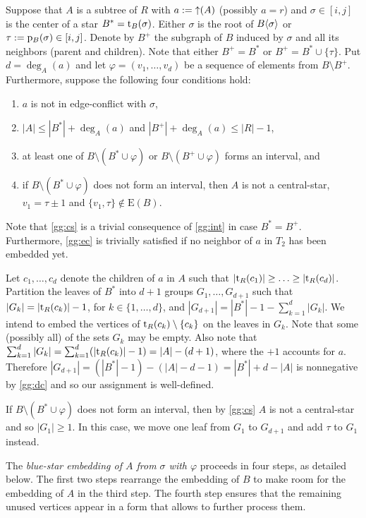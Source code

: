 \documentclass[11pt,a4paper,colorlinks=true,urlcolor=blue,citecolor=red]{article}
\theoremstyle{plain}
\newcommand{\EB}{\mathrm{E}(B)}
\begin{document}
Suppose that $A$ is a subtree of $R$ with $a:=\mathop{\uparrow}(A)$ (possibly
$a=r$) and $\sigma\in[i,j]$ is the center of a star $B^*=\mathrm t_B(\sigma)$.
Either $\sigma$ is the root of $B\langle{\sigma}\rangle$ or
$\tau:=\mathrm p_B(\sigma)\in[i,j]$. Denote by $B^+$ the subgraph of $B$
induced by $\sigma$ and all its neighbors (parent and children). Note
that either $B^+=B^*$ or $B^+=B^*\cup\{\tau\}$. Put $d=\deg_A(a)$ and
let $\varphi=(v_1,\ldots,v_d)$ be a sequence of elements from
$B\setminus B^+$. Furthermore, suppose the following four conditions
hold:
\begin{enumerate}[label={(BS\arabic*)}]\setlength{\itemindent}{4\labelsep}
  \item\label{gg:ec} $a$ is not in edge-conflict with $\sigma$,
  \item\label{gg:dc} $|A|\le|B^*|+\deg_A(a)$ and
    $|B^+|+\deg_A(a)\le|R|-1$,
  \item\label{gg:int} at least one of $B\setminus(B^*\cup\varphi)$ or
    $B\setminus(B^+\cup\varphi)$ forms an interval, and
  \item\label{gg:cs} if $B\setminus(B^*\cup\varphi)$ does not form an
    interval, then $A$ is not a central-star, $v_1=\tau\pm 1$ and
    $\{v_1,\tau\}\notin\EB$.
  \end{enumerate}
Note that \ref{gg:cs} is a trivial consequence of \ref{gg:int} in case
$B^*=B^+$. Furthermore, \ref{gg:ec} is trivially satisfied if no
neighbor of $a$ in $T_2$ has been embedded yet.

Let $c_1,\ldots,c_d$ denote the children of $a$ in $A$ such that
$|\mathrm t_R(c_1)|\ge\ldots\ge|\mathrm t_R(c_d)|$. Partition the leaves of $B^*$
into $d+1$ groups $G_1,\ldots,G_{d+1}$ such that $|G_k|=|\mathrm t_R(c_k)|-1$,
for $k\in\{1,\ldots,d\}$, and $|G_{d+1}|=|B^*|-1-\sum_{k=1}^d|G_k|$. We
intend to embed the vertices of $\mathrm t_R(c_k)\setminus\{c_k\}$ on the
leaves in $G_k$. Note that some (possibly all) of the sets $G_k$ may be
empty. Also note that
$\sum_{k=1}^d|G_k|=\sum_{k=1}^d(|\mathrm t_R(c_k)|-1)=|A|-(d+1)$, where the
$+1$ accounts for $a$. Therefore
$|G_{d+1}|=(|B^*|-1)-(|A|-d-1)=|B^*|+d-|A|$ is nonnegative by
\ref{gg:dc} and so our assignment is well-defined.

If $B\setminus(B^*\cup\varphi)$ does not form an interval, then by
\ref{gg:cs} $A$ is not a central-star and so $|G_1|\ge 1$. In this case,
we move one leaf from $G_1$ to $G_{d+1}$ and add $\tau$ to $G_1$
instead.

The \emph{blue-star embedding of $A$ from $\sigma$ with $\varphi$}
proceeds in four steps, as detailed below. The first two steps rearrange
the embedding of $B$ to make room for the embedding of $A$ in the third
step. The fourth step ensures that the remaining unused vertices appear
in a form that allows to further process them.
\end{document}

